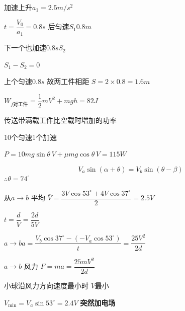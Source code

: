 

加速上升\quad $a_1=2.5\unit{m/s^2}$

$t=\dfrac{V_0}{a_1}=0.8\unit{s}$ 后匀速\quad $S_1$\quad $0.8\unit{m}$

下一个也加速$0.8\unit{s}$\quad $S_2$

$S_1-S_2=0$

上个匀速$0.8\unit{s}$ 故两工件相距 $S=2\times0.8=1.6\unit{m}$

$W_{f\text{对工件}}=\dfrac12 mV^2+mgh=82\unit{J}$

传送带满载工件比空载时增加的功率

10个匀速\quad 1个加速

$P=10mg\sin\theta\,V+\mu mg\cos\theta\,V=115\unit{W}$

\[
V_a\sin(\alpha+\theta)=V_b\sin(\theta-\beta)
\]
$\therefore\theta=74^\circ$

从$a\to b$ 平均 $\bar V=\dfrac{3V\cos53^\circ+4V\cos37^\circ}{2}=2.5V$

$t=\dfrac{d}{V}=\dfrac{2d}{5V}$ %

$a\to b$\quad $a=\dfrac{V_b\cos37^\circ-(-V_a\cos53^\circ)}{t}=\dfrac{25V^2}{2d}$ %

$a\to b$ 风力 $F=ma=\dfrac{25mV^2}{2d}$

小球沿风力方向速度最小时 $V$最小 %

$V_{\min}=V_a\sin53^\circ=2.4V$
\textbf{突然加电场}


